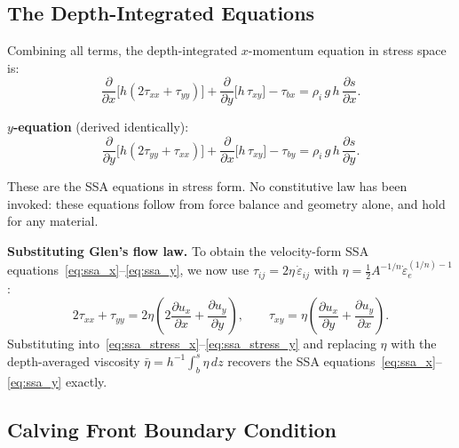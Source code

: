 \documentclass[11pt]{article}
\begin{document}
\subsection{The Depth-Integrated Equations}

Combining all terms, the depth-integrated $x$-momentum equation in stress space is:
\begin{equation}
  \boxed{\frac{\partial}{\partial x}\!\bigl[h(2\tau_{xx} + \tau_{yy})\bigr] + \frac{\partial}{\partial y}\!\bigl[h\,\tau_{xy}\bigr] - \tau_{bx} = \rho_i\,g\,h\,\frac{\partial s}{\partial x}.}
  \label{eq:ssa_stress_x}
\end{equation}

\noindent\textbf{$y$-equation} (derived identically):
\begin{equation}
  \boxed{\frac{\partial}{\partial y}\!\bigl[h(2\tau_{yy} + \tau_{xx})\bigr] + \frac{\partial}{\partial x}\!\bigl[h\,\tau_{xy}\bigr] - \tau_{by} = \rho_i\,g\,h\,\frac{\partial s}{\partial y}.}
  \label{eq:ssa_stress_y}
\end{equation}

\noindent These are the SSA equations in stress form.  No constitutive law has been invoked: these equations follow from force balance and geometry alone, and hold for any material.

\medskip
\noindent\textbf{Substituting Glen's flow law.}  To obtain the velocity-form SSA equations~\eqref{eq:ssa_x}--\eqref{eq:ssa_y}, we now use $\tau_{ij} = 2\eta\,\dot{\varepsilon}_{ij}$ with $\eta = \frac{1}{2}A^{-1/n}\dot{\varepsilon}_e^{(1/n)-1}$:
\begin{equation}
  2\tau_{xx} + \tau_{yy} = 2\eta\!\left(2\frac{\partial u_x}{\partial x} + \frac{\partial u_y}{\partial y}\right), \qquad \tau_{xy} = \eta\!\left(\frac{\partial u_x}{\partial y} + \frac{\partial u_y}{\partial x}\right).
\end{equation}
Substituting into~\eqref{eq:ssa_stress_x}--\eqref{eq:ssa_stress_y} and replacing $\eta$ with the depth-averaged viscosity $\bar{\eta} = h^{-1}\!\int_b^s \eta\,dz$ recovers the SSA equations~\eqref{eq:ssa_x}--\eqref{eq:ssa_y} exactly.

\subsection{Calving Front Boundary Condition}
\end{document}
